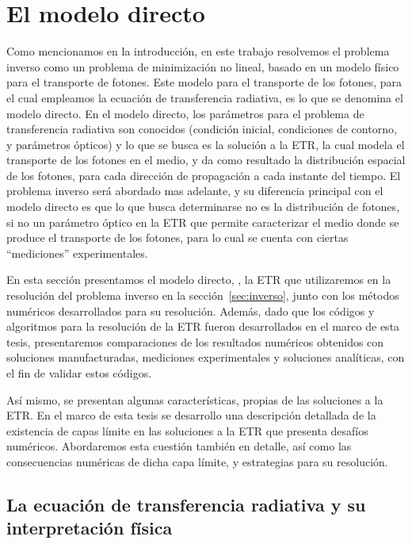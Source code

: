 \chapter{El modelo directo}
\lhead{\thepage}
\pagebreak
Como mencionamos en la introducción, en este trabajo resolvemos el problema inverso 
como un problema de minimización no lineal, basado en un modelo físico para 
el transporte de fotones. Este modelo para el transporte de los fotones, 
para el cual empleamos la ecuación de transferencia radiativa, es lo que 
se denomina el modelo directo. En el modelo directo, los parámetros 
 para el problema de transferencia radiativa son conocidos (condición inicial, condiciones de contorno, 
y parámetros ópticos) y lo que se busca es la solución a la ETR, la cual modela 
el transporte de los fotones en el medio, y da como resultado la distribución 
espacial de los fotones, para cada dirección de propagación a cada instante del tiempo. 
El problema inverso será abordado mas adelante, 
y su diferencia principal con el modelo directo es que lo que busca 
determinarse no es la distribución de fotones, si no un parámetro óptico en la ETR 
que permite caracterizar el medio donde se produce el transporte de los fotones, 
para lo cual se cuenta con ciertas ``mediciones'' experimentales.

En esta sección presentamos el modelo directo, \ie, 
la ETR que utilizaremos 
en la resolución del problema inverso en la sección~\ref{sec:inverso}, 
junto con los métodos numéricos desarrollados para su resolución. 
Además, dado que los códigos y algoritmos para la resolución de la ETR 
fueron desarrollados en el marco de esta tesis, presentaremos 
comparaciones de los resultados numéricos obtenidos con soluciones manufacturadas, 
mediciones experimentales y soluciones analíticas, con el fin de validar estos códigos.  

Así mismo, se presentan algunas características, propias de las soluciones 
a la ETR. En el marco de esta tesis se desarrollo una descripción detallada 
de la existencia de capas límite en las soluciones a la ETR que 
presenta desafíos numéricos. Abordaremos esta cuestión también en detalle, 
así como las consecuencias numéricas de dicha capa límite, y 
estrategias para su resolución. 


\section{La ecuación de transferencia radiativa y su interpretación física}
\label{sec:ETR}

